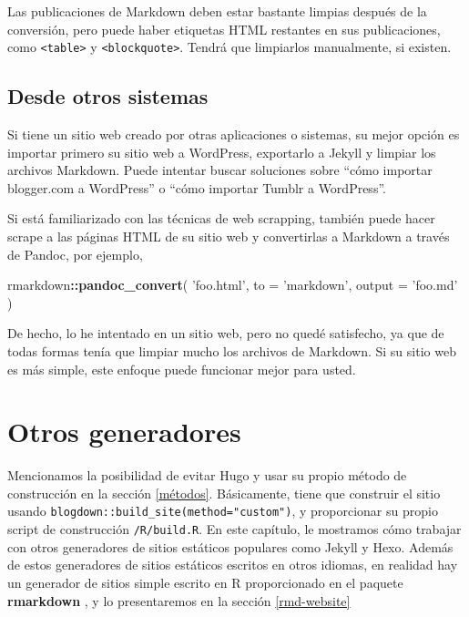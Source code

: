 \documentclass[12pt,]{krantz}
\makeatletter
\newenvironment{Shaded}{\begin{snugshade}}{\end{snugshade}}
\newcommand{\DataTypeTok}[1]{\textcolor[rgb]{0.13,0.29,0.53}{#1}}
\newcommand{\KeywordTok}[1]{\textcolor[rgb]{0.13,0.29,0.53}{\textbf{#1}}}
\newcommand{\NormalTok}[1]{#1}
\newcommand{\OperatorTok}[1]{\textcolor[rgb]{0.81,0.36,0.00}{\textbf{#1}}}
\newcommand{\StringTok}[1]{\textcolor[rgb]{0.31,0.60,0.02}{#1}}
\newenvironment{kframe}{%
\medskip{}
\setlength{\fboxsep}{.8em}
 \def\at@end@of@kframe{}%
 \ifinner\ifhmode%
  \def\at@end@of@kframe{\end{minipage}}%
  \begin{minipage}{\columnwidth}%
 \fi\fi%
 \def\FrameCommand##1{\hskip\@totalleftmargin \hskip-\fboxsep
 \colorbox{shadecolor}{##1}\hskip-\fboxsep
     \hskip-\linewidth \hskip-\@totalleftmargin \hskip\columnwidth}%
 \MakeFramed {\advance\hsize-\width
   \@totalleftmargin\z@ \linewidth\hsize
   \@setminipage}}%
 {\par\unskip\endMakeFramed%
 \at@end@of@kframe}
\renewenvironment{Shaded}{\begin{kframe}}{\end{kframe}}
\theoremstyle{definition}
\theoremstyle{definition}
\theoremstyle{definition}
\theoremstyle{remark}
\makeatother
\begin{document}
Las publicaciones de Markdown deben estar bastante limpias después de la
conversión, pero puede haber etiquetas HTML restantes en sus
publicaciones, como \texttt{\textless{}table\textgreater{}} y
\texttt{\textless{}blockquote\textgreater{}}. Tendrá que limpiarlos
manualmente, si existen.

\hypertarget{desde-otros-sistemas}{%
\section{Desde otros sistemas}\label{desde-otros-sistemas}}

Si tiene un sitio web creado por otras aplicaciones o sistemas, su mejor
opción es importar primero su sitio web a WordPress, exportarlo a Jekyll
y limpiar los archivos Markdown. Puede intentar buscar soluciones sobre
``cómo importar blogger.com a WordPress'' o ``cómo importar Tumblr a
WordPress''.

Si está familiarizado con las técnicas de web scrapping, también puede
hacer scrape a las páginas HTML de su sitio web y convertirlas a
Markdown a través de Pandoc, por ejemplo,

\begin{Shaded}
\begin{Highlighting}[]
\NormalTok{rmarkdown}\OperatorTok{::}\KeywordTok{pandoc_convert}\NormalTok{(}
  \StringTok{'foo.html'}\NormalTok{, }\DataTypeTok{to =} \StringTok{'markdown'}\NormalTok{, }\DataTypeTok{output =} \StringTok{'foo.md'}
\NormalTok{)}
\end{Highlighting}
\end{Shaded}

De hecho, lo he intentado en un sitio web, pero no quedé satisfecho, ya
que de todas formas tenía que limpiar mucho los archivos de Markdown. Si
su sitio web es más simple, este enfoque puede funcionar mejor para
usted.

\hypertarget{otros-generadores}{%
\chapter{Otros generadores}\label{otros-generadores}}

Mencionamos la posibilidad de evitar Hugo y usar su propio método de
construcción en la sección \ref{métodos}. Básicamente, tiene que
construir el sitio usando
\texttt{blogdown::build\_site(method="custom")}, y proporcionar su
propio script de construcción \texttt{/R/build.R}. En este capítulo, le
mostramos cómo trabajar con otros generadores de sitios estáticos
populares como Jekyll y Hexo. Además de estos generadores de sitios
estáticos escritos en otros idiomas, en realidad hay un generador de
sitios simple escrito en R proporcionado en el paquete
\textbf{rmarkdown} \citep{R-rmarkdown}, y lo presentaremos en la sección
\ref{rmd-website}
\end{document}
